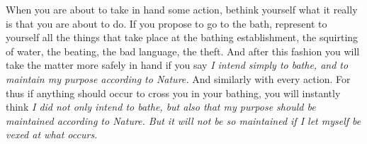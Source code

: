 When you are about to take in hand some action, bethink yourself what it really
is that  you are about to  do. If you propose  to go to the  bath, represent to
yourself  all the  things that  take place  at the  bathing establishment,  the
squirting of  water, the beating, the  bad language, the theft.  And after this
fashion you will take the matter more  safely in hand if you say \emph{I intend
simply to bathe, and to maintain my purpose according to Nature.} And similarly
with every  action. For  thus if  anything should  occur to  cross you  in your
bathing, you  will instantly think  \emph{I did not  only intend to  bathe, but
also that my purpose should be maintained  according to Nature. But it will not
be so maintained if I let myself be vexed at what occurs.}
